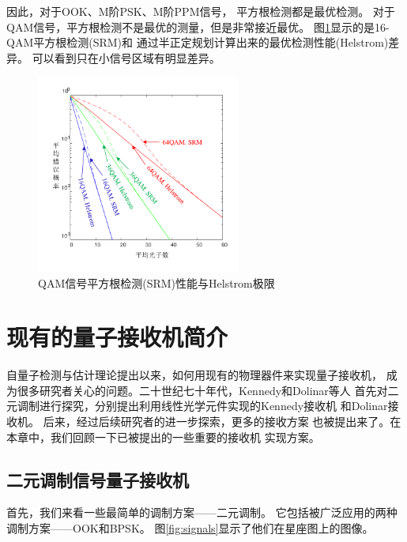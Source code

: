 因此，对于OOK、M阶PSK、M阶PPM信号，
平方根检测都是最优检测。
对于QAM信号，平方根检测不是最优的测量，但是非常接近最优。
图\ref{fig:SRM-vs-Hel}显示的是16-QAM平方根检测(SRM)和
通过半正定规划计算出来的最优检测性能(Helstrom)差异。
可以看到只在小信号区域有明显差异。

\begin{figure}
\centering
  \includegraphics[width=0.6\textwidth]{figures/chap2/QAM-SRM-vs-Helstrom}
  \caption{QAM信号平方根检测(SRM)性能与Helstrom极限}
  \label{fig:SRM-vs-Hel}
\end{figure}


\section{现有的量子接收机简介}
自量子检测与估计理论提出以来，如何用现有的物理器件来实现量子接收机，
成为很多研究者关心的问题。二十世纪七十年代，Kennedy和Dolinar等人
首先对二元调制进行探究，分别提出利用线性光学元件实现的Kennedy接收机
和Dolinar接收机\cite{kennedy1973near,dolinar1973optimum}。
后来，经过后续研究者的进一步探索，更多的接收方案
也被提出来了。在本章中，我们回顾一下已被提出的一些重要的接收机
实现方案。
\subsection{二元调制信号量子接收机}
首先，我们来看一些最简单的调制方案——二元调制。
它包括被广泛应用的两种调制方案——OOK和BPSK。
图\ref{fig:signals}显示了他们在星座图上的图像。



